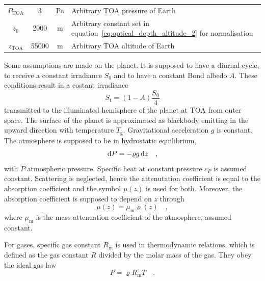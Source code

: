 \documentclass[a4paper,10pt,twocolumn,\classoptions]{article}
\newcommand{\zTOA}{z_\text{TOA}}
\newcommand{\PTOA}{P_\text{TOA}}
\begin{document}
\begin{table}[h]
\begin{tabular}[b]{cccp{}}
    $\PTOA$            & \num{3}            & \unit{\pascal}                         & Arbitrary TOA pressure of Earth                                            \\ 
    $z_0$            & \num{2000}            & \unit{\metre}                        & Arbitrary constant set in equation~\ref{eq:optical_depth_altitude_2} for normalisation                                            \\
    $\zTOA$            & \num{55000}            & \unit{\metre}                         & Arbitrary TOA altitude of Earth                                            \\
    \bottomrule
  \end{tabular}
\end{table}

Some assumptions are made on the planet.
It is supposed to have a diurnal cycle, to receive a constant irradiance $S_0$ and to have a constant Bond albedo $A$. These conditions result in a costant irradiance
\begin{equation}
  \label{eq:irradiance_sun_transmitted}
  S_\text{t} = (1 - A) \frac{S_0}{4}
\end{equation}
transmitted to the illuminated hemisphere of the planet at TOA from outer space.
The surface of the planet is approximated as blackbody emitting in the upward direction with temperature $T_\text{g}$. 
Gravitational acceleration $g$ is constant.
The atmosphere is supposed to be in hydrostatic equilibrium,
\begin{equation}
  \label{eq:hydrostatic_equilibrium}
  \odif{P} = - \varrho g \odif{z}
  \quad ,
\end{equation}
with $P$ atmospheric pressure.
Specific heat at constant pressure $c_P$ is assumed constant.
Scattering is neglected, hence the attenutation coefficient is equal to the absorption coefficient and the symbol $\mu(z)$ is used for both.
Moreover, the absorption coefficient is supposed to depend on $z$ through
\begin{equation}
  \label{eq:absorption coefficient}
  \mu(z) = \mu_\text{m} \varrho(z)
  \quad ,
\end{equation}
where $\mu_\text{m}$ is the mass attenuation coefficient of the atmosphere, assumed constant.

For gases, specific gas constant $R_\text{m}$ is used in thermodynamic relations, which is defined as the gas constant $R$ divided by the molar mass of the gas.
They obey the ideal gas law
\begin{equation}
  \label{eq:ideal_gas_law}
  P = \varrho R_\text{m} T
  \quad .
\end{equation}
\end{document}

